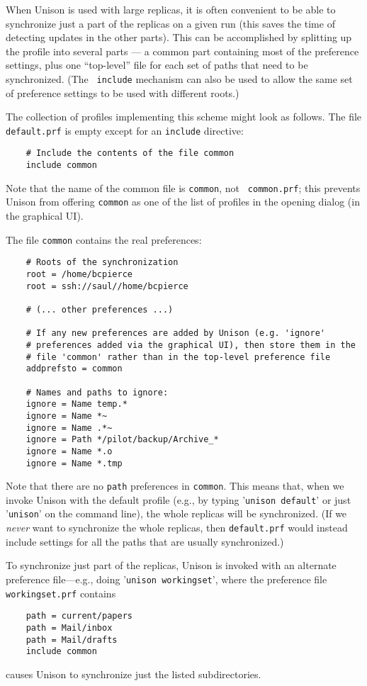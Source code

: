 \documentclass{article}
\begin{document}

When Unison is used with large replicas, it is often convenient to be
able to synchronize just a part of the replicas on a given run (this
saves the time of detecting updates in the other parts).  This can be
accomplished by splitting up the profile into several parts --- a common
part containing most of the preference settings, plus one ``top-level''
file for each set of paths that need to be synchronized.  (The {\tt
  include} mechanism can also be used to allow the same set of preference
settings to be used with different roots.)

The collection
of profiles implementing this scheme might look as follows.
%
The file {\tt default.prf} is empty except for an {\tt include}
directive:
\begin{verbatim}
    # Include the contents of the file common
    include common
\end{verbatim}
Note that the name of the common file is {\tt common}, not {\tt
  common.prf}; this prevents Unison from offering {\tt common} as one of
the list of profiles in the opening dialog (in the graphical UI).

The file {\tt common} contains the real preferences:
\begin{verbatim}
    # Roots of the synchronization
    root = /home/bcpierce
    root = ssh://saul//home/bcpierce

    # (... other preferences ...)

    # If any new preferences are added by Unison (e.g. 'ignore'
    # preferences added via the graphical UI), then store them in the
    # file 'common' rather than in the top-level preference file
    addprefsto = common

    # Names and paths to ignore:
    ignore = Name temp.*
    ignore = Name *~
    ignore = Name .*~
    ignore = Path */pilot/backup/Archive_*
    ignore = Name *.o
    ignore = Name *.tmp
\end{verbatim}
Note that there are no {\tt path} preferences in {\tt common}.  This
means that, when we invoke Unison with the default profile (e.g., by
typing '{\tt unison default}' or just '{\tt unison}' on the command
line), the whole replicas will be synchronized.  (If we {\em never} want
to synchronize the whole replicas, then {\tt default.prf} would instead
include settings for all the paths that are usually synchronized.)

To synchronize just part of the replicas, Unison is invoked with an
alternate preference file---e.g., doing '{\tt unison workingset}', where the
preference file {\tt workingset.prf} contains
\begin{verbatim}
    path = current/papers
    path = Mail/inbox
    path = Mail/drafts
    include common
\end{verbatim}
causes Unison to synchronize just the listed subdirectories.
\end{document}
